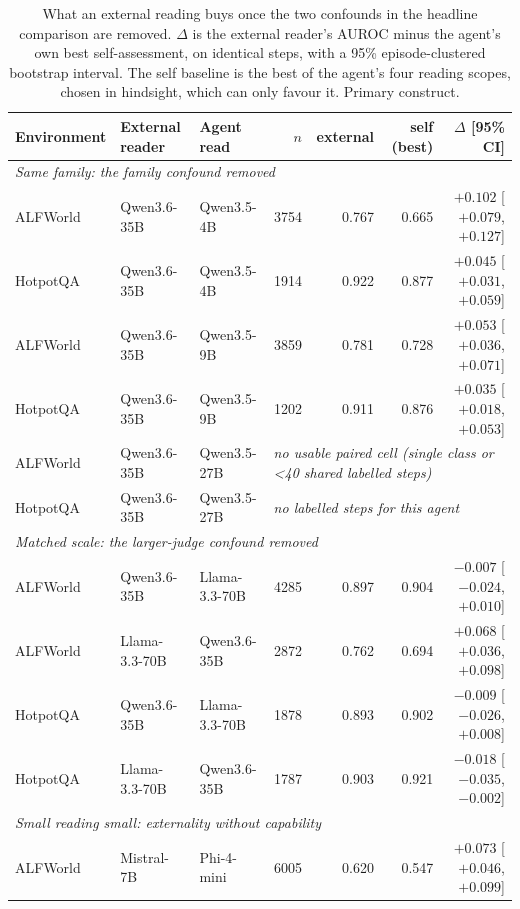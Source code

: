 \begin{table}[t]
\centering
\small
\caption{What an external reading buys once the two confounds in the headline comparison are removed. $\Delta$ is the external reader's AUROC minus the agent's own best self-assessment, on identical steps, with a 95\% episode-clustered bootstrap interval. The self baseline is the best of the agent's four reading scopes, chosen in hindsight, which can only favour it. Primary construct.}
\label{tab:matched}
\begin{tabular}{lllrrrr}
\toprule
Environment & External reader & Agent read & $n$ & external & self (best) & $\Delta$ [95\% CI] \\
\midrule
\multicolumn{7}{l}{\emph{Same family: the family confound removed}} \\
ALFWorld & Qwen3.6-35B & Qwen3.5-4B & 3754 & 0.767 & 0.665 & $+0.102$ [$+0.079$, $+0.127$] \\
HotpotQA & Qwen3.6-35B & Qwen3.5-4B & 1914 & 0.922 & 0.877 & $+0.045$ [$+0.031$, $+0.059$] \\
ALFWorld & Qwen3.6-35B & Qwen3.5-9B & 3859 & 0.781 & 0.728 & $+0.053$ [$+0.036$, $+0.071$] \\
HotpotQA & Qwen3.6-35B & Qwen3.5-9B & 1202 & 0.911 & 0.876 & $+0.035$ [$+0.018$, $+0.053$] \\
ALFWorld & Qwen3.6-35B & Qwen3.5-27B & \multicolumn{4}{l}{\emph{no usable paired cell (single class or <40 shared labelled steps)}} \\
HotpotQA & Qwen3.6-35B & Qwen3.5-27B & \multicolumn{4}{l}{\emph{no labelled steps for this agent}} \\
\midrule
\multicolumn{7}{l}{\emph{Matched scale: the larger-judge confound removed}} \\
ALFWorld & Qwen3.6-35B & Llama-3.3-70B & 4285 & 0.897 & 0.904 & $-0.007$ [$-0.024$, $+0.010$] \\
ALFWorld & Llama-3.3-70B & Qwen3.6-35B & 2872 & 0.762 & 0.694 & $+0.068$ [$+0.036$, $+0.098$] \\
HotpotQA & Qwen3.6-35B & Llama-3.3-70B & 1878 & 0.893 & 0.902 & $-0.009$ [$-0.026$, $+0.008$] \\
HotpotQA & Llama-3.3-70B & Qwen3.6-35B & 1787 & 0.903 & 0.921 & $-0.018$ [$-0.035$, $-0.002$] \\
\midrule
\multicolumn{7}{l}{\emph{Small reading small: externality without capability}} \\
ALFWorld & Mistral-7B & Phi-4-mini & 6005 & 0.620 & 0.547 & $+0.073$ [$+0.046$, $+0.099$] \\

\end{tabular}
\end{table}
